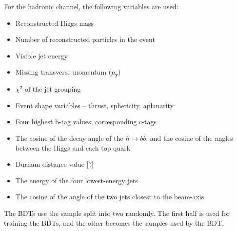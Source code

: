 For the hadronic channel, the following variables are used:

\begin{itemize}
	\item Reconstructed Higgs mass
	\item Number of reconstructed particles in the event
	\item Visible jet energy
	\item Missing transverse momentum ($p_T$)
	\item $\chi^2$ of the jet grouping
	\item Event shape variables -- thrust, sphericity, aplanarity
	\item Four highest b-tag values, corresponding c-tags
	\item The cosine of the decay angle of the $h \rightarrow b\overline{b}$, and the cosine of the angles between the Higgs and each top quark
	\item Durham distance value [?]
	\item The energy of the four lowest-energy jets
	\item The cosine of the angle of the two jets closest to the beam-axis
\end{itemize}

The \acrshort{BDT}s use the sample split into two randomly. The first half is used for training the \acrshort{BDT}s, and the other becomes the samples used by the \acrshort{BDT}.



%
%

